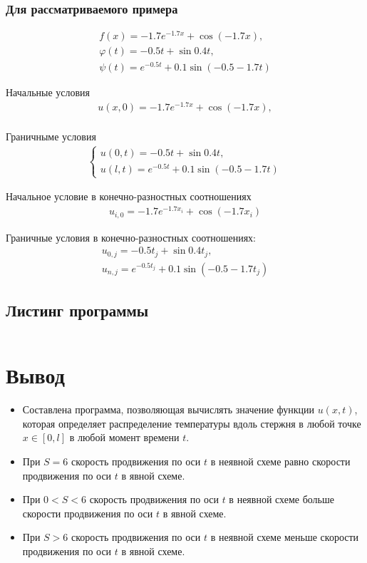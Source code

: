 \subsubsection*{Для рассматриваемого примера}

\begin{align}
	f(x) = -1.7 e^{-1.7 x} + \cos(-1.7 x), \\
	\varphi(t) = -0.5 t + \sin{0.4 t},     \\
	\psi(t) = e^{-0.5 t} + 0.1 \sin(-0.5 -1.7 t)
\end{align}

Начальные  условия
\begin{align}
	u(x, 0) =-1.7 e^{-1.7 x} + \cos(-1.7 x), \\
\end{align}

Граничныме условия
\begin{align}
	\begin{cases}
		u(0,t) = -0.5 t + \sin{0.4 t}, \\
		u(l,t) = e^{-0.5 t} + 0.1 \sin(-0.5 -1.7 t)
	\end{cases}
\end{align}

Начальное условие в конечно-разностных соотношениях
\begin{align}
	u_{i,0} = -1.7 e^{-1.7 x_i} + \cos(-1.7 x_i)
\end{align}

Граничные условия в конечно-разностных соотношениях:
\begin{align}
	u_{0,j} = -0.5 t_j + \sin{0.4 t_j}, \\
	u_{n,j} = e^{-0.5 t_j} + 0.1 \sin(-0.5 -1.7 t_j)
\end{align}

\subsection{Листинг программы}
\inputminted[frame=lines, linenos]{cpp}{listings/main.cc}



\section{Вывод}
\begin{itemize}
	\item Составлена программа, позволяющая вычислять значение функции \(u(x,t)\), которая определяет распределение температуры вдоль стержня в любой точке \(x \in [0, l]\) в любой момент времени \(t\).
	\item При \(S = 6\) скорость продвижения по оси \(t\) в неявной схеме равно скорости продвижения по оси \(t\) в явной схеме.
	\item При \(0 < S < 6\) скорость продвижения по оси \(t\) в неявной схеме больше скорости продвижения по оси \(t\) в явной схеме.
	\item При \(S > 6\) скорость продвижения по оси \(t\) в неявной схеме меньше скорости продвижения по оси \(t\) в явной схеме.
\end{itemize}
